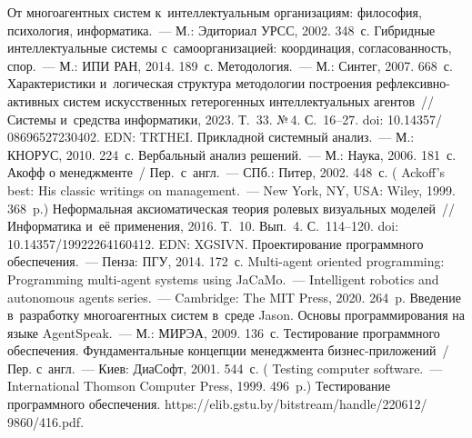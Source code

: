 \begin{multicols}{2}
{{\begin{thebibliography}{99}
 От многоагентных сис\-тем к~интеллектуальным организациям: 
философия, психология, информатика.~--- М.: Эдиториал УРСС, 2002. 348~с.
   Ги\-брид\-ные интеллектуальные 
сис\-те\-мы с~самоорганизацией: координация, со\-гла\-со\-ван\-ность, спор.~--- М.: ИПИ РАН, 2014. 
189~с.
   Методология.~--- М.: Синтег, 2007. 668~с.
   Характеристики и~логическая структура методологии по\-стро\-ения  
реф\-лек\-сив\-но-ак\-тив\-ных сис\-тем искусственных гетерогенных интеллектуальных 
агентов~// Сис\-те\-мы и~средства \mbox{информатики}, 2023. Т.~33. №\,4. С.~16--27. doi: 
10.14357/ 08696527230402. EDN: TRTHEI.
   Прикладной сис\-те\-мный анализ.~--- М.: 
КНОРУС, 2010. 224~с.
   Вербальный анализ решений.~--- М.: Наука, 2006. 181~с.
   Акофф о менеджменте~/ Пер.\ с~англ.~--- СПб.: Питер, 2002. 448~с.
  ( Ackoff's best: His classic writings on management.~--- New 
York, NY, USA: Wiley, 1999. 368~p.)
Неформальная аксиоматическая тео\-рия ролевых визуальных моделей~// Информатика и~её 
применения, 2016. Т.~10. Вып.~4. С.~114--120.  doi: 10.14357/19922264160412. EDN: XGSIVN.
   Проектирование программного обеспечения.~--- Пенза: ПГУ, 2014. 
172~с.
   Multi-agent oriented programming: 
Programming multi-agent systems using JaCaMo.~--- Intelligent robotics and autonomous agents 
series.~--- Cambridge: The MIT Press, 2020. 264~p.
   Введение в~разработку многоагентных сис\-тем 
в~среде Jason. Основы программирования на языке AgentSpeak.~--- М.: \mbox{МИРЭА}, 2009. 136~с.
   Тестирование про\-грам\-мно\-го обеспечения. 
Фундаментальные концепции менеджмента биз\-нес-при\-ло\-же\-ний~/
Пер. с~англ.~--- Киев: ДиаСофт, 
2001. 544~с. ( {Testing computer software}.~--- 
International Thomson Computer Press,  1999. 496~p.)
   Тестирование программного обеспечения. {\sf 
https://elib.gstu.by/bitstream/handle/220612/ 9860/416.pdf}.

\end{thebibliography}

 }
 }

\end{multicols}

